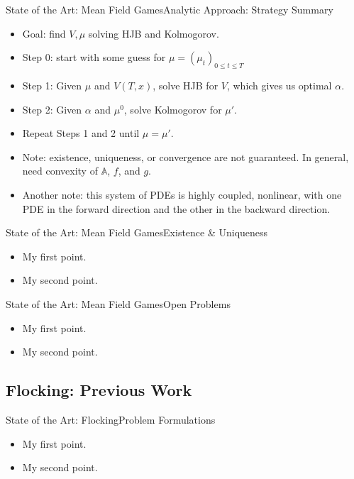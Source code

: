 \documentclass{beamer}
\begin{document}
\begin{frame}{State of the Art: Mean Field Games}{Analytic Approach: Strategy Summary}
	\begin{itemize}
				\item {
					Goal: find $V, \mu$ solving HJB and Kolmogorov.
				}
				\item {
					Step 0: start with some guess for $\mu=(\mu_t)_{0 \leq t \leq T}$
				}
				\item {
					Step 1: Given $\mu$ and $V(T,x)$, solve HJB for $V$, which gives us optimal $\alpha$.
				}
				\item {
					Step 2: Given $\alpha$ and $\mu^0$, solve Kolmogorov for $\mu '$.
				}
				\item {
					Repeat Steps 1 and 2 until $\mu = \mu '$.
				}
				\pause
				\item {
					Note: existence, uniqueness, or convergence are not guaranteed. In general, need convexity of $\mathbb{A}$, $f$, and $g$.
				}
				\pause
				\item {
					Another note: this system of PDEs is highly coupled, nonlinear, with one PDE in the forward direction and the other in the backward direction.
				}
	\end{itemize}
\end{frame}

\begin{frame}{State of the Art: Mean Field Games}{Existence \& Uniqueness}
	\begin{itemize}
		\item {
			My first point.
		}
		\item {
			My second point.
		}
	\end{itemize}
\end{frame}

\begin{frame}{State of the Art: Mean Field Games}{Open Problems}
	\begin{itemize}
		\item {
			My first point.
		}
		\item {
			My second point.
		}
	\end{itemize}
\end{frame}

\subsection{Flocking: Previous Work}

\begin{frame}{State of the Art: Flocking}{Problem Formulations}
	\begin{itemize}
		\item {
			My first point.
		}
		\item {
			My second point.
		}
	\end{itemize}
\end{frame}
\end{document}
